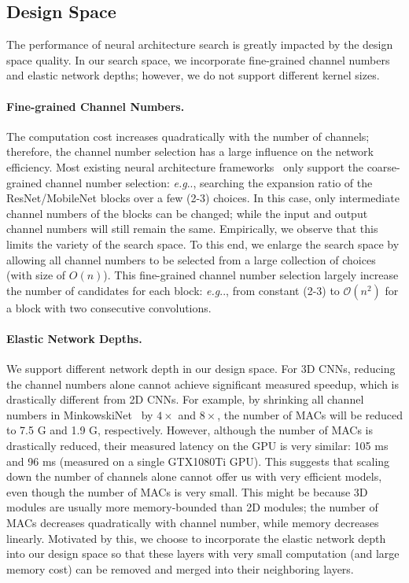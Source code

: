 \documentclass[runningheads]{llncs}
\makeatletter
\DeclareRobustCommand\onedot{\futurelet\@let@token\@onedot}
\def\@onedot{\ifx\@let@token.\else.\null\fi\xspace}
\def\eg{\emph{e.g}\onedot} \def\Eg{\emph{E.g}\onedot}
\makeatother
\begin{document}
\subsection{Design Space}

The performance of neural architecture search is greatly impacted by the design space quality. In our search space, we incorporate fine-grained channel numbers and elastic network depths; however, we do not support different kernel sizes.

\paragraph{Fine-grained Channel Numbers.}

The computation cost increases quadratically with the number of channels; therefore, the channel number selection has a large influence on the network efficiency. Most existing neural architecture frameworks~\cite{cai2019proxylessnas} only support the coarse-grained channel number selection: \eg, searching the expansion ratio of the ResNet/MobileNet blocks over a few (2-3) choices. In this case, only intermediate channel numbers of the blocks can be changed; while the input and output channel numbers will still remain the same. Empirically, we observe that this limits the variety of the search space. To this end, we enlarge the search space by allowing all channel numbers to be selected from a large collection of choices (with size of $O(n)$). This fine-grained channel number selection largely increase the number of candidates for each block: \eg, from constant (2-3) to $\mathcal{O}(n^2)$ for a block with two consecutive convolutions.

\paragraph{Elastic Network Depths.}

We support different network depth in our design space. For 3D CNNs, reducing the channel numbers alone cannot achieve significant measured speedup, which is drastically different from 2D CNNs. For example, by shrinking all channel numbers in MinkowskiNet~\cite{choy20194d} by $4\times$ and $8\times$, the number of MACs will be reduced to 7.5 G and 1.9 G, respectively. However, although the number of MACs is drastically reduced, their measured latency on the GPU is very similar: 105 ms and 96 ms (measured on a single GTX1080Ti GPU). This suggests that scaling down the number of channels alone cannot offer us with very efficient models, even though the number of MACs is very small. This might be because 3D modules are usually more memory-bounded than 2D modules; the number of MACs decreases quadratically with channel number, while memory decreases linearly. Motivated by this, we choose to incorporate the elastic network depth into our design space so that these layers with very small computation (and large memory cost) can be removed and merged into their neighboring layers.
\end{document}
